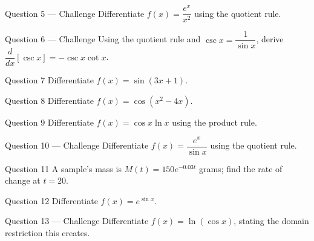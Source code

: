 \documentclass[11pt]{article}
\begin{document}
\begin{qbox}{Question 5 --- Challenge}
Differentiate $f(x)=\dfrac{e^x}{x^2}$ using the quotient rule.\workspace{3.2cm}
\end{qbox}

\begin{qbox}{Question 6 --- Challenge}
Using the quotient rule and $\csc x=\dfrac1{\sin x}$, derive $\dfrac{d}{dx}[\csc x]=-\csc x\cot x$.\workspace{3.4cm}
\end{qbox}

\begin{qbox}{Question 7}
Differentiate $f(x)=\sin(3x+1)$.\workspace{2.4cm}
\end{qbox}

\begin{qbox}{Question 8}
Differentiate $f(x)=\cos(x^2-4x)$.\workspace{2.4cm}
\end{qbox}

\begin{qbox}{Question 9}
Differentiate $f(x)=\cos x\ln x$ using the product rule.\workspace{2.4cm}
\end{qbox}

\begin{qbox}{Question 10 --- Challenge}
Differentiate $f(x)=\dfrac{e^x}{\sin x}$ using the quotient rule.\workspace{3.2cm}
\end{qbox}

\begin{qbox}{Question 11}
A sample's mass is $M(t)=150e^{-0.03t}$ grams; find the rate of change at $t=20$.\workspace{2.4cm}
\end{qbox}

\begin{qbox}{Question 12}
Differentiate $f(x)=e^{\sin x}$.\workspace{2.4cm}
\end{qbox}

\begin{qbox}{Question 13 --- Challenge}
Differentiate $f(x)=\ln(\cos x)$, stating the domain restriction this creates.\workspace{3.2cm}
\end{qbox}

\clearpage
{}
\end{document}

